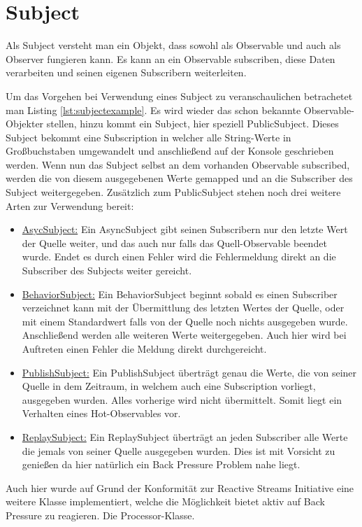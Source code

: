 \section{Subject}
Als Subject versteht man ein Objekt, dass sowohl als Observable und auch als Observer fungieren kann. Es kann an ein Observable subscriben, diese Daten verarbeiten und seinen eigenen Subscribern weiterleiten. 

Um das Vorgehen bei Verwendung eines Subject zu veranschaulichen betrachetet man Listing \ref{lst:subjectexample}. Es wird wieder das schon bekannte Observable-Objekter stellen, hinzu kommt ein Subject, hier speziell PublicSubject. Dieses Subject bekommt eine Subscription in welcher alle String-Werte in Großbuchstaben umgewandelt und anschließend auf der Konsole geschrieben werden. Wenn nun das Subject selbst an dem vorhanden Observable subscribed, werden die von diesem ausgegebenen Werte gemapped und an die Subscriber des Subject weitergegeben. Zusätzlich zum PublicSubject stehen noch drei weitere Arten zur Verwendung bereit:
\begin{itemize}
	\item \underline{AsycSubject:} Ein AsyncSubject gibt seinen Subscribern nur den letzte Wert der Quelle weiter, und das auch nur falls das Quell-Observable beendet wurde. Endet es durch einen Fehler wird die Fehlermeldung direkt an die Subscriber des Subjects weiter gereicht.
	\item \underline{BehaviorSubject:} Ein BehaviorSubject beginnt sobald es einen Subscriber verzeichnet kann mit der Übermittlung des letzten Wertes der Quelle, oder mit einem Standardwert falls von der Quelle noch nichts ausgegeben wurde. Anschließend werden alle weiteren Werte weitergegeben. Auch hier wird bei Auftreten einen Fehler die Meldung direkt durchgereicht.
	\item \underline{PublishSubject:} Ein PublishSubject überträgt genau die Werte, die von seiner Quelle in dem Zeitraum, in welchem auch eine Subscription vorliegt, ausgegeben wurden. Alles vorherige wird nicht übermittelt. Somit liegt ein Verhalten eines Hot-Observables vor.
	\item \underline{ReplaySubject:} Ein ReplaySubject überträgt an jeden Subscriber alle Werte die jemals von seiner Quelle ausgegeben wurden. Dies ist mit Vorsicht zu genießen da hier natürlich ein Back Pressure Problem nahe liegt. 
\end{itemize}
Auch hier wurde auf Grund der Konformität zur Reactive Streams Initiative eine weitere Klasse implementiert, welche die Möglichkeit bietet aktiv auf Back Pressure zu reagieren. Die Processor-Klasse.
